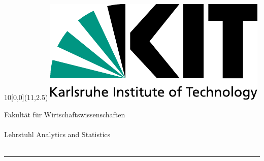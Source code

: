 
\newcommand{\diameter}{20}
\newcommand{\xone}{-15}
\newcommand{\xtwo}{160}
\newcommand{\yone}{15}
\newcommand{\ytwo}{-253}

\begin{titlepage}
	\begin{textblock}{10}[0,0](11,2.5)
		\includegraphics[width=.48\textwidth]{logos/KITLogo_EN_RGB.pdf}	\end{textblock}
	\vspace*{3.5cm}
	\begin{center}
		\Large{
			Fakultät für Wirtschaftswissenschaften\\
			\myinstitute \\
			Lehrstuhl Analytics and Statistics \\
		}
	    \vspace*{1.5cm}
		\Huge{\mytitle}\\
		\rule{0.05\textwidth}{0.5pt}\\
	    \Huge{\mytitleger}
		\vspace*{1.5cm}\\
		\Large{
			\mytype
		}\\
		\vspace*{1cm}
		\huge{\myname}\\
			\Large{\matricle}\\
		\vspace*{1cm}
	\end{center}
\Large{
\begin{center}

\end{center}}
\end{titlepage}
